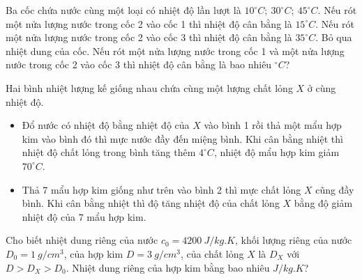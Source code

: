 \begin{ex}%
	Ba cốc chứa nước cùng một loại có nhiệt độ lần lượt là $10^\circ C;\ 30^\circ C;\ 45^\circ C$. Nếu rót một nửa lượng nước trong cốc 2 vào cốc 1 thì nhiệt độ cân bằng là $15^\circ C$. Nếu rót một nửa lượng nước trong cốc 2 vào cốc 3 thì nhiệt độ cân bằng là $35^\circ C$. Bỏ qua nhiệt dung của cốc. Nếu rót một nửa lượng nước trong cốc 1 và một nửa lượng nước trong cốc 2 vào cốc 3 thì nhiệt độ cân bằng là bao nhiêu $^\circ C$? 
\end{ex}

\begin{ex}%
	Hai bình nhiệt lượng kế giống nhau chứa cùng một lượng chất lỏng $X$ ở cùng nhiệt độ.
	\begin{itemize}
		\item Đổ nước có nhiệt độ bằng nhiệt độ của $X$ vào bình 1 rồi thả một mẩu hợp kim vào bình đó thì mực nước đầy đến miệng bình. Khi cân bằng nhiệt thì nhiệt độ chất lỏng trong bình tăng thêm $4^\circ C$, nhiệt độ mẩu hợp kim giảm $70^\circ C$.
		\item Thả 7 mẩu hợp kim giống như trên vào bình 2 thì mực chất lỏng $X$ cũng đầy bình. Khi cân bằng nhiệt thì độ tăng nhiệt độ của chất lỏng $X$ bằng độ giảm nhiệt độ của 7 mẩu hợp kim.
	\end{itemize}
	Cho biết nhiệt dung riêng của nước $c_0 = 4200\ J/kg.K$, khối lượng riêng của nước $D_0 = 1\ g/cm^3$, của hợp kim $D = 3\ g/cm^3$, của chất lỏng $X$ là $D_X$ với $D>D_X>D_0$. Nhiệt dung riêng của hợp kim bằng bao nhiêu $J/kg.K$?
\end{ex}
